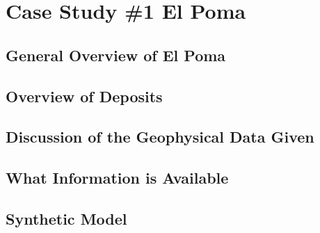 
\chapter{Case Study \#1 El Poma}
\label{ch:CaseStudy1}


\section{General Overview of El Poma}
\label{sec:General Over View of El Poma}

%

\section{Overview of Deposits}
\label{sec:Overview of Deposits:ElPoma}

\section{Discussion of the Geophysical Data Given}
\label{sec:Discussion of the Geophysical Data Given:ElPoma}


\section{What Information is Available}
\label{sec:What Information is Available:ElPoma}

%
%

\section{Synthetic Model}
\label{sec:Synthetic Mode:ElPomal}

